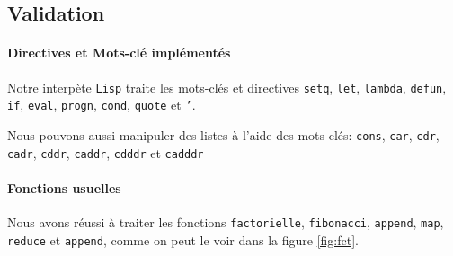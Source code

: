 \subsection{Validation}

\paragraph{Directives et Mots-clé implémentés}

Notre interpète \texttt{Lisp} traite les mots-clés et directives
\texttt{setq}, \texttt{let}, \texttt{lambda}, \texttt{defun},
\texttt{if}, \texttt{eval}, \texttt{progn}, \texttt{cond},
\texttt{quote} et \texttt{'}.  

Nous pouvons aussi manipuler des listes à l'aide des mots-clés:
\texttt{cons}, \texttt{car}, \texttt{cdr}, \texttt{cadr},
\texttt{cddr}, \texttt{caddr}, \texttt{cdddr} et \texttt{cadddr}

\paragraph{Fonctions usuelles}

Nous avons réussi à traiter les fonctions \texttt{factorielle},
\texttt{fibonacci}, \texttt{append}, \texttt{map}, \texttt{reduce} et
\texttt{append}, comme on peut le voir dans la figure \ref{fig:fct}.

